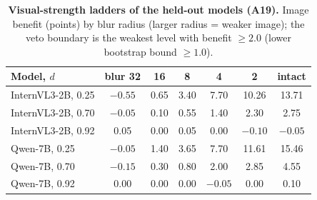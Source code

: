\begin{table}[h]
  \centering
  \footnotesize
  \setlength{\tabcolsep}{2.4pt}
  \caption{\textbf{Held-out transfer (A19, seed 20261011).} $g$: image benefit of the intact image (points); Dev.: absolute deviation from the prediction; $V^\ast$: veto boundary (7 = none); $M_T$: median black-image log-odds margin; accuracies (\%) on the planted and on the cue-free (original) test questions; short.: share of shortest-option predictions.}
  \label{tab:a19}
\end{table}

\begin{table}[h]
  \centering
  \footnotesize
  \setlength{\tabcolsep}{3pt}
  \begin{tabular}{@{}lcccccc@{}}
    \toprule
    Model, $d$ & blur 32 & 16 & 8 & 4 & 2 & intact \\
    \midrule
    InternVL3-2B, 0.25 & $-0.55$ & 0.65 & 3.40 & 7.70 & 10.26 & 13.71 \\
    InternVL3-2B, 0.70 & $-0.05$ & 0.10 & 0.55 & 1.40 & 2.30 & 2.75 \\
    InternVL3-2B, 0.92 & 0.05 & 0.00 & 0.05 & 0.00 & $-0.10$ & $-0.05$ \\
    Qwen-7B, 0.25 & $-0.05$ & 1.40 & 3.65 & 7.70 & 11.61 & 15.46 \\
    Qwen-7B, 0.70 & $-0.15$ & 0.30 & 0.80 & 2.00 & 2.85 & 4.55 \\
    Qwen-7B, 0.92 & 0.00 & 0.00 & 0.00 & $-0.05$ & 0.00 & 0.10 \\
    \bottomrule
  \end{tabular}
  \caption{\textbf{Visual-strength ladders of the held-out models (A19).} Image benefit (points) by blur radius (larger radius = weaker image); the veto boundary is the weakest level with benefit $\ge2.0$ (lower bootstrap bound $\ge1.0$).}
  \label{tab:a19ladder}
\end{table}
